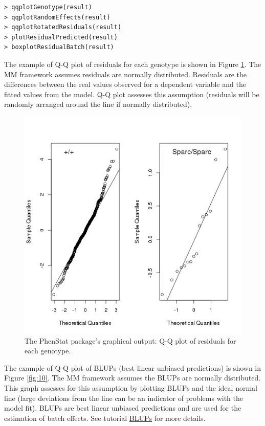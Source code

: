\documentclass[12pt,a4paper]{article}
\begin{document}
\begingroup
    \fontsize{8pt}{12pt}\selectfont
\begin{verbatim}
> qqplotGenotype(result)
> qqplotRandomEffects(result)
> qqplotRotatedResiduals(result)
> plotResidualPredicted(result)
> boxplotResidualBatch(result)
\end{verbatim}
\endgroup 

The example of Q-Q plot of residuals for each genotype is shown in Figure \ref{fig:09}. The MM framework assumes residuals are normally distributed. Residuals are the differences between the real values observed for a dependent variable and the fitted values from the model. Q-Q plot assesses this assumption (residuals will be randomly arranged around the line if normally distributed). 
\begin{figure}[!tpb]%
\centerline{\includegraphics[scale=0.5]{qqplotGenotype.png}}
\caption{The PhenStat package's graphical output: Q-Q plot of residuals for each genotype.}\label{fig:09}
\end{figure}


The example of Q-Q plot of BLUPs (best linear unbiased predictions) is shown in Figure \ref{fig:10}. The MM framework assumes the BLUPs are normally distributed. This graph assesses for this assumption by plotting BLUPs and the ideal normal line (large deviations from the line can be an indicator of problems with the model fit). BLUPs are best linear unbiased predictions and are used for the estimation of batch effects. See tutorial \href{http://www.extension.org/pages/61006/the-solcap-tomato-phenotypic-data:-estimating-heritability-and-blups-for-traits#.Ui4zjWRgYXc}{BLUPs} for more details.
\end{document}

